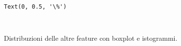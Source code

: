 \documentclass[11pt]{article}
\newcommand{\prompt}[4]{
        \llap{{\color{#2}[#3]: #4}}\vspace{-1.25em}
    }
\begin{document}
            \begin{tcolorbox}[breakable, boxrule=.5pt, size=fbox, pad at break*=1mm, opacityfill=0]
\prompt{Out}{outcolor}{9}{\hspace{3.5pt}}
\begin{Verbatim}[commandchars=\\\{\}]
Text(0, 0.5, '\%')
\end{Verbatim}
\end{tcolorbox}
        
    \begin{center}
    \end{center}
    { \hspace*{\fill} \\}
    
    Distribuzioni delle altre feature con boxplot e istogrammi.
\end{document}
